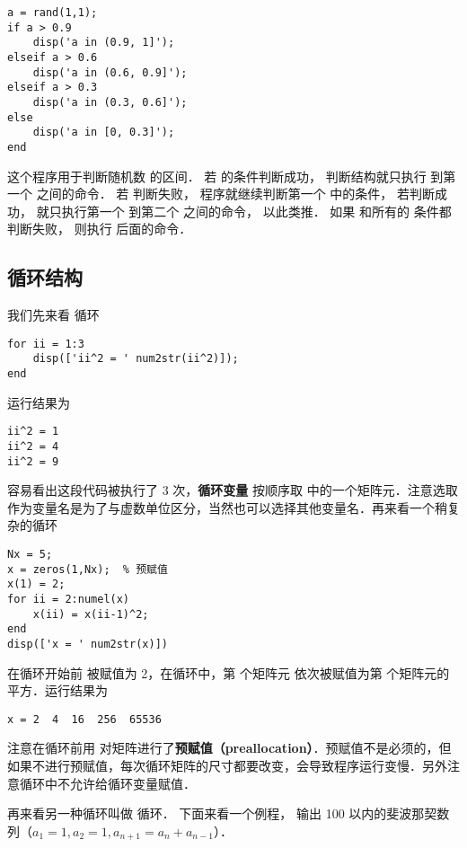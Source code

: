\begin{lstlisting}[language=MyMatlab]
a = rand(1,1);
if a > 0.9
    disp('a in (0.9, 1]');
elseif a > 0.6
    disp('a in (0.6, 0.9]');
elseif a > 0.3
    disp('a in (0.3, 0.6]');
else
    disp('a in [0, 0.3]');
end
\end{lstlisting}

这个程序用于判断随机数  的区间． 若  的条件判断成功， 判断结构就只执行  到第一个  之间的命令． 若  判断失败， 程序就继续判断第一个  中的条件， 若判断成功， 就只执行第一个  到第二个  之间的命令， 以此类推． 如果  和所有的  条件都判断失败， 则执行  后面的命令．

\subsection{循环结构}
我们先来看  循环

\begin{lstlisting}[language=MyMatlab]
for ii = 1:3
    disp(['ii^2 = ' num2str(ii^2)]);
end
\end{lstlisting}

运行结果为
\begin{lstlisting}[language=MatlabCom]
ii^2 = 1
ii^2 = 4
ii^2 = 9
\end{lstlisting}
容易看出这段代码被执行了 3 次，\textbf{循环变量}  按顺序取  中的一个矩阵元．注意选取  作为变量名是为了与虚数单位区分，当然也可以选择其他变量名．再来看一个稍复杂的循环

\begin{lstlisting}[language=MyMatlab]
Nx = 5;
x = zeros(1,Nx);  % 预赋值
x(1) = 2;
for ii = 2:numel(x)
    x(ii) = x(ii-1)^2;
end
disp(['x = ' num2str(x)])
\end{lstlisting}

在循环开始前  被赋值为 2，在循环中，第  个矩阵元 依次被赋值为第  个矩阵元的平方．运行结果为
\begin{lstlisting}[language=MatlabCom]
x = 2  4  16  256  65536
\end{lstlisting}
注意在循环前用  对矩阵进行了\textbf{预赋值（preallocation）}．预赋值不是必须的，但如果不进行预赋值，每次循环矩阵的尺寸都要改变，会导致程序运行变慢．另外注意循环中不允许给循环变量赋值．

再来看另一种循环叫做  循环． 下面来看一个例程， 输出 100 以内的斐波那契数列（$a_1 = 1, a_2 = 1, a_{n+1} = a_{n} + a_{n-1}$）．


